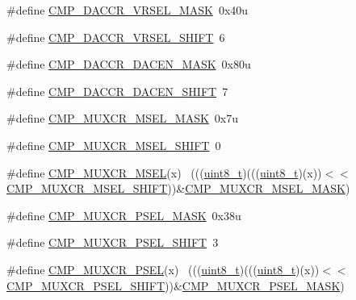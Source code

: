 \begin{DoxyCompactItemize}
\item 
\#define \hyperlink{group___c_m_p___register___masks_gac9eceaf5b3e478eb1a332681c8bcf160}{C\+M\+P\+\_\+\+D\+A\+C\+C\+R\+\_\+\+V\+R\+S\+E\+L\+\_\+\+M\+A\+SK}~0x40u
\item 
\#define \hyperlink{group___c_m_p___register___masks_gab9f804a9c4ecafbaaa82f2fc0ec69083}{C\+M\+P\+\_\+\+D\+A\+C\+C\+R\+\_\+\+V\+R\+S\+E\+L\+\_\+\+S\+H\+I\+FT}~6
\item 
\#define \hyperlink{group___c_m_p___register___masks_gacfd8aec2de81865d8f5fc0f06d17ba08}{C\+M\+P\+\_\+\+D\+A\+C\+C\+R\+\_\+\+D\+A\+C\+E\+N\+\_\+\+M\+A\+SK}~0x80u
\item 
\#define \hyperlink{group___c_m_p___register___masks_ga85aa1686a0d5a7de2375bfab7167bb93}{C\+M\+P\+\_\+\+D\+A\+C\+C\+R\+\_\+\+D\+A\+C\+E\+N\+\_\+\+S\+H\+I\+FT}~7
\item 
\#define \hyperlink{group___c_m_p___register___masks_ga6ff83366097d3be5ae93234b68684cf5}{C\+M\+P\+\_\+\+M\+U\+X\+C\+R\+\_\+\+M\+S\+E\+L\+\_\+\+M\+A\+SK}~0x7u
\item 
\#define \hyperlink{group___c_m_p___register___masks_gad74d8206afe9b7ad009b0a7ac2bbf1cf}{C\+M\+P\+\_\+\+M\+U\+X\+C\+R\+\_\+\+M\+S\+E\+L\+\_\+\+S\+H\+I\+FT}~0
\item 
\#define \hyperlink{group___c_m_p___register___masks_ga61a47f441cc9f0145482ce3f1561160a}{C\+M\+P\+\_\+\+M\+U\+X\+C\+R\+\_\+\+M\+S\+EL}(x)                                            ~(((\hyperlink{_p_e___types_8h_aba7bc1797add20fe3efdf37ced1182c5}{uint8\+\_\+t})(((\hyperlink{_p_e___types_8h_aba7bc1797add20fe3efdf37ced1182c5}{uint8\+\_\+t})(x))$<$$<$\hyperlink{group___c_m_p___register___masks_gad74d8206afe9b7ad009b0a7ac2bbf1cf}{C\+M\+P\+\_\+\+M\+U\+X\+C\+R\+\_\+\+M\+S\+E\+L\+\_\+\+S\+H\+I\+FT}))\&\hyperlink{group___c_m_p___register___masks_ga6ff83366097d3be5ae93234b68684cf5}{C\+M\+P\+\_\+\+M\+U\+X\+C\+R\+\_\+\+M\+S\+E\+L\+\_\+\+M\+A\+SK})
\item 
\#define \hyperlink{group___c_m_p___register___masks_gaba9739da107b2a2b908af338d14df160}{C\+M\+P\+\_\+\+M\+U\+X\+C\+R\+\_\+\+P\+S\+E\+L\+\_\+\+M\+A\+SK}~0x38u
\item 
\#define \hyperlink{group___c_m_p___register___masks_gab686629f56ced4b88c699f0f610dece5}{C\+M\+P\+\_\+\+M\+U\+X\+C\+R\+\_\+\+P\+S\+E\+L\+\_\+\+S\+H\+I\+FT}~3
\item 
\#define \hyperlink{group___c_m_p___register___masks_gae2f01a26dfcb880ec6dcca859629c743}{C\+M\+P\+\_\+\+M\+U\+X\+C\+R\+\_\+\+P\+S\+EL}(x)                                            ~(((\hyperlink{_p_e___types_8h_aba7bc1797add20fe3efdf37ced1182c5}{uint8\+\_\+t})(((\hyperlink{_p_e___types_8h_aba7bc1797add20fe3efdf37ced1182c5}{uint8\+\_\+t})(x))$<$$<$\hyperlink{group___c_m_p___register___masks_gab686629f56ced4b88c699f0f610dece5}{C\+M\+P\+\_\+\+M\+U\+X\+C\+R\+\_\+\+P\+S\+E\+L\+\_\+\+S\+H\+I\+FT}))\&\hyperlink{group___c_m_p___register___masks_gaba9739da107b2a2b908af338d14df160}{C\+M\+P\+\_\+\+M\+U\+X\+C\+R\+\_\+\+P\+S\+E\+L\+\_\+\+M\+A\+SK})

\end{DoxyCompactItemize}
